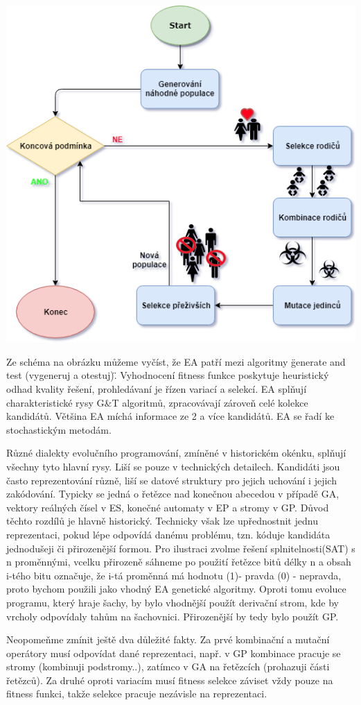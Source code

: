 \begin{center}
\includegraphics[scale=0.64]{../img/EA.png}
\end{center}
Ze schéma na obrázku můžeme vyčíst, že EA patří mezi algoritmy \"generate and test (vygeneruj a otestuj)\". Vyhodnocení fitness funkce poskytuje heuristický odhad kvality řešení, prohledávaní je řízen variací a selekcí. EA splňují charakteristické rysy G\&T algoritmů, zpracovávají zároveň celé kolekce kandidátů. Většina EA míchá informace ze 2 a více kandidátů. EA se řadí ke stochastickým metodám. \par
Různé dialekty evolučního programování, zmíněné v historickém okénku, splňují všechny tyto hlavní rysy. Liší se pouze v technických detailech. Kandidáti jsou často reprezentování různě, liší se datové struktury pro jejich uchování i jejich zakódování. Typicky se jedná o řetězce nad konečnou abecedou v případě GA, vektory reálných čísel v ES, konečné automaty v EP a stromy v GP. Důvod těchto rozdílů je hlavně historický. Technicky však lze upřednostnit jednu reprezentaci, pokud lépe odpovídá danému problému, tzn. kóduje kandidáta jednodušeji či přirozenější formou. Pro ilustraci zvolme řešení splnitelnosti(SAT) s n proměnnými, vcelku přirozeně sáhneme po použití řetězce bitů délky n a obsah i-tého bitu označuje, že i-tá proměnná má hodnotu (1)- pravda (0) - nepravda, proto bychom použili jako vhodný EA genetické algoritmy. Oproti tomu evoluce programu, který hraje šachy, by bylo vhodnější použít derivační strom, kde by vrcholy odpovídaly tahům na šachovnici. Přirozenější by tedy bylo použít GP. \par
Neopomeňme zmínit ještě dva důležité fakty. Za prvé kombinační a mutační operátory musí odpovídat dané reprezentaci, např. v GP kombinace pracuje se stromy (kombinuji podstromy..), zatímco v GA na řetězcích (prohazuji části řetězců). Za druhé oproti variacím musí fitness selekce záviset vždy pouze na fitness funkci, takže selekce pracuje nezávisle na reprezentaci.
